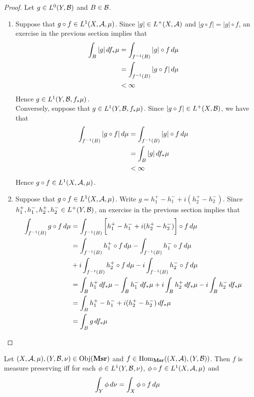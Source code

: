 \documentclass{book}
\begin{document}
	\begin{proof} Let $g \in L^0(Y, \mathcal{B})$ and $B \in \mathcal{B}$.
		\begin{enumerate}
			\item Suppose that $g \circ f \in L^1(X, \mathcal{A}, \mu)$. Since $|g| \in L^+(X, \mathcal{A})$ and $|g \circ f| = |g| \circ f$, an exercise in the previous section implies that 
			\begin{align*}
				\int_B |g|  \, d f_*\mu  
				& = \int_{f^{-1}(B)} |g| \circ f \, d \mu \\
				& = \int_{f^{-1}(B)} |g \circ f| \, d \mu \\
				& < \infty 
			\end{align*}
			Hence $g \in L^1(Y, \mathcal{B}, f_*\mu)$. \\
			Conversely, suppose that $g \in L^1(Y, \mathcal{B}, f_*\mu)$. Since $|g \circ f| \in L^+(X, \mathcal{B})$, we have that 
			\begin{align*}
				\int_{f^{-1}(B)} |g \circ f| \, d \mu   
				& = \int_{f^{-1}(B)} |g| \circ f \, d \mu \\
				& = \int_B |g|  \, d f_*\mu \\
				& < \infty 
			\end{align*}
			Hence $g \circ f \in L^1(X, \mathcal{A}, \mu)$. \\
			\item Suppose that $g \circ f \in L^1(X, \mathcal{A}, \mu)$. Write $g = h_1^+ - h_1^- + i(h_2^+ - h_2^-)$. Since $h_1^+, h_1^-, h_2^+, h_2^- \in L^+(Y, \mathcal{B})$, an exercise in the previous section implies that 
			\begin{align*}
				\int_{f^{-1}(B)} g \circ f \, d \mu
				& = \int_{f^{-1}(B)} \bigg[ h_1^+ - h_1^- + i(h_2^+ - h_2^-) \bigg] \circ f \, d \mu \\
				& = \int_{f^{-1}(B)}  h_1^+ \circ f \, d \mu - \int_{f^{-1}(B)}  h_1^- \circ f \, d \mu \\
				& + i \int_{f^{-1}(B)} h_2^+ \circ f \, d \mu -i \int_{f^{-1}(B)}  h_2^- \circ f \, d \mu \\
				& = \int_B h_1^+ \, d f_*\mu - \int_B h_1^- \, d f_*\mu + i \int_B h_2^+ \, d f_*\mu - i \int_B h_2^- \, d f_*\mu \\
				& = \int_B  h_1^+ - h_1^- + i(h_2^+ - h_2^-)  \, d f_*\mu \\
				& = \int_B g \, d f_*\mu
			\end{align*}
		\end{enumerate}
	\end{proof}

	\begin{ex}  
		Let $(X, \mathcal{A}, \mu), (Y, \mathcal{B}, \nu) \in \operatorname{Obj}(\operatorname{\text{\textbf{Msr}}})$ and $f \in \operatorname{Hom}_{\operatorname{\text{\textbf{Msr}}}}((X, \mathcal{A}), (Y, \mathcal{B}))$. Then $f$ is measure preserving iff for each $\phi \in L^1(Y, \mathcal{B}, \nu)$, $\phi \circ f \in L^1(X, \mathcal{A}, \mu)$ and 
		$$\int_Y \phi \, d \nu = \int_X \phi \circ f \, d \mu $$
	\end{ex}
	
\end{document}
